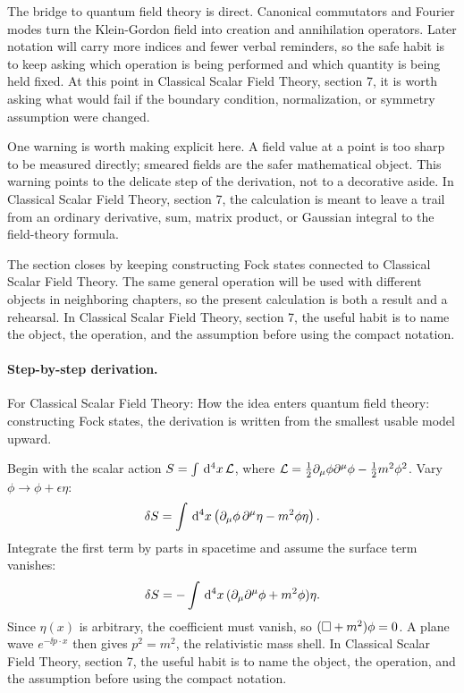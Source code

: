 The bridge to quantum field theory is direct.  Canonical commutators and Fourier modes turn the Klein-Gordon field into creation and annihilation operators.  Later notation will carry more indices and fewer verbal reminders, so the safe habit is to keep asking which operation is being performed and which quantity is being held fixed.  At this point in Classical Scalar Field Theory, section 7, it is worth asking what would fail if the boundary condition, normalization, or symmetry assumption were changed.

One warning is worth making explicit here.  A field value at a point is too sharp to be measured directly; smeared fields are the safer mathematical object.  This warning points to the delicate step of the derivation, not to a decorative aside.  In Classical Scalar Field Theory, section 7, the calculation is meant to leave a trail from an ordinary derivative, sum, matrix product, or Gaussian integral to the field-theory formula.

The section closes by keeping constructing Fock states connected to Classical Scalar Field Theory.  The same general operation will be used with different objects in neighboring chapters, so the present calculation is both a result and a rehearsal.  In Classical Scalar Field Theory, section 7, the useful habit is to name the object, the operation, and the assumption before using the compact notation.



\paragraph{Step-by-step derivation.}

For Classical Scalar Field Theory: How the idea enters quantum field theory: constructing Fock states, the derivation is written from the smallest usable model upward.

Begin with the scalar action \(S=\int\,\mathrm d^4x\,\mathcal L\), where \(\mathcal L=\frac12\partial_\mu\phi\partial^\mu\phi-\frac12m^2\phi^2\).  Vary \(\phi\to\phi+\epsilon\eta\):
\[
  \delta S=\int\,\mathrm d^4x\left(\partial_\mu\phi\,\partial^\mu\eta-m^2\phi\eta\right).
\]
Integrate the first term by parts in spacetime and assume the surface term vanishes:
\[
  \delta S=-\int\,\mathrm d^4x\,(\partial_\mu\partial^\mu\phi+m^2\phi)\eta.
\]
Since \(\eta(x)\) is arbitrary, the coefficient must vanish, so \((\Box+m^2)\phi=0\).  A plane wave \(e^{-\ii p\cdot x}\) then gives \(p^2=m^2\), the relativistic mass shell.  In Classical Scalar Field Theory, section 7, the useful habit is to name the object, the operation, and the assumption before using the compact notation.

